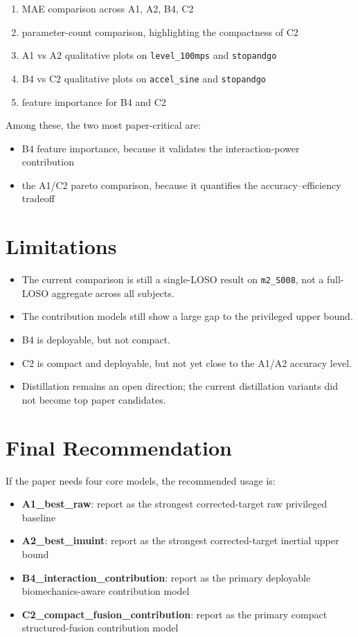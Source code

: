 \documentclass[11pt,a4paper]{article}
\begin{document}
\begin{enumerate}
\item MAE comparison across A1, A2, B4, C2
\item parameter-count comparison, highlighting the compactness of C2
\item A1 vs A2 qualitative plots on \texttt{level\_100mps} and \texttt{stopandgo}
\item B4 vs C2 qualitative plots on \texttt{accel\_sine} and \texttt{stopandgo}
\item feature importance for B4 and C2
\end{enumerate}

Among these, the two most paper-critical are:
\begin{itemize}
\item B4 feature importance, because it validates the interaction-power contribution
\item the A1/C2 pareto comparison, because it quantifies the accuracy--efficiency tradeoff
\end{itemize}

\section{Limitations}

\begin{itemize}
\item The current comparison is still a single-LOSO result on \texttt{m2\_S008}, not a full-LOSO aggregate across all subjects.
\item The contribution models still show a large gap to the privileged upper bound.
\item B4 is deployable, but not compact.
\item C2 is compact and deployable, but not yet close to the A1/A2 accuracy level.
\item Distillation remains an open direction; the current distillation variants did not become top paper candidates.
\end{itemize}

\section{Final Recommendation}

If the paper needs four core models, the recommended usage is:

\begin{itemize}
\item \textbf{A1\_best\_raw}: report as the strongest corrected-target raw privileged baseline
\item \textbf{A2\_best\_imuint}: report as the strongest corrected-target inertial upper bound
\item \textbf{B4\_interaction\_contribution}: report as the primary deployable biomechanics-aware contribution model
\item \textbf{C2\_compact\_fusion\_contribution}: report as the primary compact structured-fusion contribution model
\end{itemize}
\end{document}

